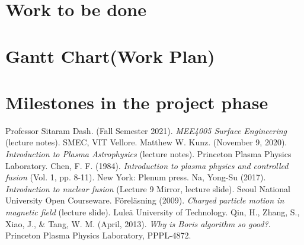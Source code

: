 \documentclass[12pt]{article}
\begin{document}
	\section{Work to be done}
	
	\section{Gantt Chart(Work Plan)}
	
	\section{Milestones in the project phase}
	
	\begin{thebibliography}{}
		Professor Sitaram Dash. (Fall Semester 2021). \textit{MEE4005 Surface Engineering} (lecture notes). SMEC, VIT Vellore.
		Matthew W. Kunz. (November 9, 2020). \textit{Introduction to Plasma Astrophysics} (lecture notes). Princeton Plasma Physics Laboratory.
		Chen, F. F. (1984). \textit{Introduction to plasma physics and controlled fusion} (Vol. 1, pp. 8-11). New York: Plenum press.
		Na, Yong-Su (2017). \textit{Introduction to nuclear fusion} (Lecture 9 Mirror, lecture slide). Seoul National University Open Courseware.
		F\"{o}rel\"{a}sning (2009). \textit{Charged particle motion in magnetic field} (lecture slide). Lule\"{a} University of Technology.
		Qin, H., Zhang, S., Xiao, J., $\&$ Tang, W. M. (April, 2013). \textit{Why is Boris algorithm so good?}. Princeton Plasma Physics Laboratory, PPPL-4872.
		
	\end{thebibliography}
\end{document}
